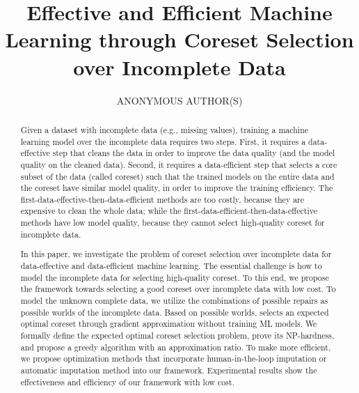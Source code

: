 \documentclass[acmsmall]{acmart}
\begin{document}
\title{Effective and Efficient Machine Learning through Coreset Selection over Incomplete Data}

\author{ANONYMOUS AUTHOR(S)}
\authorsaddresses{}


\begin{abstract}
Given a dataset with incomplete data (e.g., missing values), training a machine learning model over the incomplete data requires two steps. First,  it requires a data-effective step that cleans the data in order to improve the data quality (and the model quality on the cleaned data). Second, it requires a data-efficient step that selects a core subset of the data (called coreset) such that the trained models on the entire data and the coreset have similar model quality, in order to improve the training efficiency. The first-data-effective-then-data-efficient methods are too costly, because they are expensive to clean the whole data; while the first-data-efficient-then-data-effective methods have low model quality, because they cannot select high-quality coreset for incomplete data.
	
In this paper, we investigate the problem of coreset selection over incomplete data for data-effective and data-efficient machine learning. The essential challenge is how to model the incomplete data for selecting high-quality coreset.  To this end, we propose the \ours framework towards selecting a good coreset over incomplete data with low cost. To model the unknown complete data, we utilize the combinations of possible repairs as possible worlds of the incomplete data. 	Based on possible worlds, \ours  selects an expected optimal coreset through gradient approximation without training ML models. We formally define the expected optimal coreset selection problem, prove its NP-hardness, and propose a greedy algorithm with an approximation ratio. To make \ours more efficient, we  propose optimization methods that incorporate human-in-the-loop imputation or automatic imputation method into our framework.  
 Experimental results show the effectiveness and efficiency of our framework with low cost.
\end{abstract}
\end{document}
